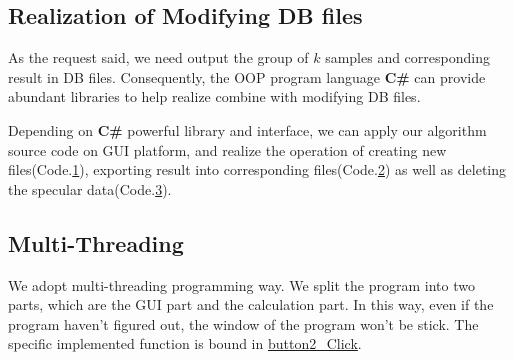 \subsection{Realization of Modifying DB files}

As the request said, we need output the group of $k$ samples and corresponding result in DB files.
Consequently, the OOP program language \textbf{C\#} can provide abundant libraries
to help realize combine with modifying DB files.

Depending on \textbf{C\#} powerful library and interface, we can apply our algorithm source code on GUI platform,
and realize the operation of creating new files(Code.\hyperref[code:create]{1}), 
exporting result into corresponding files(Code.\hyperref[code:insert]{2})
as well as deleting the specular data(Code.\hyperref[code:delete]{3}).  
\label{code:create}
\label{code:insert}
\label{code:delete}
\subsection{Multi-Threading}
    
We adopt multi-threading programming way. We split the program into two parts, which are the GUI part and the 
calculation part. In this way, even if the program haven't figured out, the window of the program won't be stick.
The specific implemented function is bound in \hyperref[code:multi]{button2\_Click}.
\label{code:multi}

    
